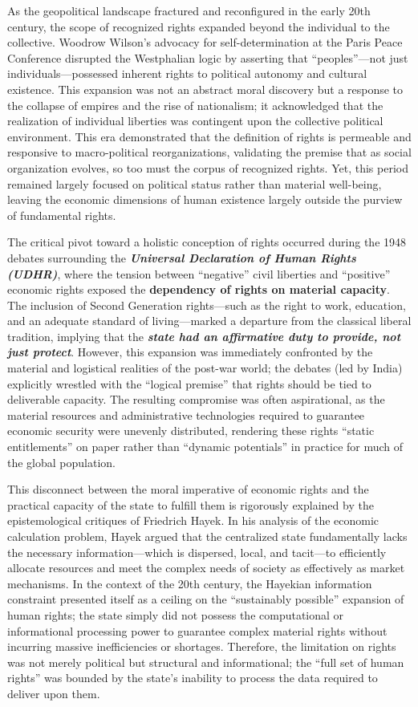 As the geopolitical landscape fractured and reconfigured in the early
20th century, the scope of recognized rights expanded beyond the
individual to the collective. Woodrow Wilson's advocacy for
self-determination at the Paris Peace Conference disrupted the
Westphalian logic by asserting that ``peoples''---not just
individuals---possessed inherent rights to political autonomy and
cultural existence. This expansion was not an abstract moral discovery
but a response to the collapse of empires and the rise of nationalism;
it acknowledged that the realization of individual liberties was
contingent upon the collective political environment. This era
demonstrated that the definition of rights is permeable and responsive
to macro-political reorganizations, validating the premise that as
social organization evolves, so too must the corpus of recognized
rights. Yet, this period remained largely focused on political status
rather than material well-being, leaving the economic dimensions of
human existence largely outside the purview of fundamental rights.

The critical pivot toward a holistic conception of rights occurred
during the 1948 debates surrounding the \textbf{\emph{Universal
Declaration of Human Rights (UDHR)}}, where the tension between
``negative'' civil liberties and ``positive'' economic rights exposed
the \textbf{dependency of rights on material capacity}. The inclusion of
Second Generation rights---such as the right to work, education, and an
adequate standard of living---marked a departure from the classical
liberal tradition, implying that the \textbf{\emph{state had an
affirmative duty to provide, not just protect}}. However, this expansion
was immediately confronted by the material and logistical realities of
the post-war world; the debates (led by India) explicitly wrestled with
the ``logical premise'' that rights should be tied to deliverable
capacity. The resulting compromise was often aspirational, as the
material resources and administrative technologies required to guarantee
economic security were unevenly distributed, rendering these rights
``static entitlements'' on paper rather than ``dynamic potentials'' in
practice for much of the global population.

This disconnect between the moral imperative of economic rights and the
practical capacity of the state to fulfill them is rigorously explained
by the epistemological critiques of Friedrich Hayek. In his analysis of
the economic calculation problem, Hayek argued that the centralized
state fundamentally lacks the necessary information---which is
dispersed, local, and tacit---to efficiently allocate resources and meet
the complex needs of society as effectively as market mechanisms. In the
context of the 20th century, the Hayekian information constraint
presented itself as a ceiling on the ``sustainably possible'' expansion
of human rights; the state simply did not possess the computational or
informational processing power to guarantee complex material rights
without incurring massive inefficiencies or shortages. Therefore, the
limitation on rights was not merely political but structural and
informational; the ``full set of human rights'' was bounded by the
state's inability to process the data required to deliver upon them.


